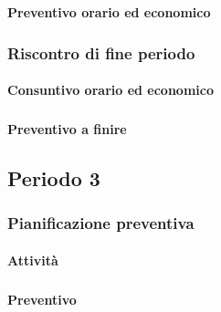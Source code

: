 \planningTable{
	
}


\paragraph{Preventivo orario ed economico}
\subparagraph*{}

\contabilitaTable{
	
}

\subsubsection{Riscontro di fine periodo}


\paragraph{Consuntivo orario ed economico}
\subparagraph*{}

\contabilitaTable{
	
}

\paragraph{Preventivo a finire}
\subparagraph*{}

\pafTable{
	
}



\pagebreak
\subsection{Periodo 3}

\subsubsection{Pianificazione preventiva}

\paragraph{Attività}
\subparagraph*{}

\planningTable{
	
}

\paragraph{Preventivo}
\subparagraph*{}


